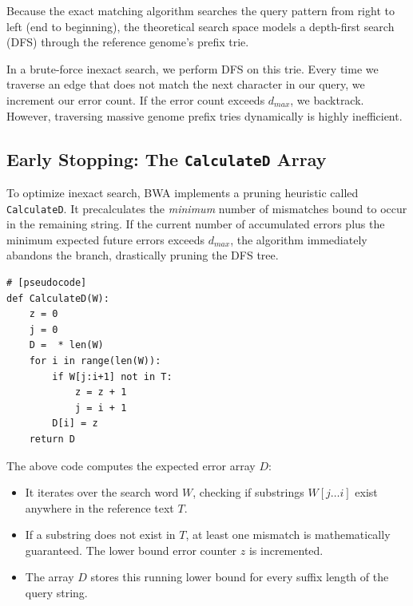 Because the exact matching algorithm searches the query pattern from right to left (end to beginning), the theoretical search space models a depth-first search (DFS) through the reference genome's prefix trie. 


In a brute-force inexact search, we perform DFS on this trie. Every time we traverse an edge that does not match the next character in our query, we increment our error count. If the error count exceeds $d_{max}$, we backtrack. However, traversing massive genome prefix tries dynamically is highly inefficient.

\subsection{Early Stopping: The \texttt{CalculateD} Array}

To optimize inexact search, BWA implements a pruning heuristic called \texttt{CalculateD}. It precalculates the \textit{minimum} number of mismatches bound to occur in the remaining string. If the current number of accumulated errors plus the minimum expected future errors exceeds $d_{max}$, the algorithm immediately abandons the branch, drastically pruning the DFS tree.

\begin{verbatim}
# [pseudocode]
def CalculateD(W):
    z = 0
    j = 0
    D =  * len(W)
    for i in range(len(W)):
        if W[j:i+1] not in T:
            z = z + 1
            j = i + 1
        D[i] = z
    return D
\end{verbatim}

The above code computes the expected error array $D$:
\begin{itemize}
    \item It iterates over the search word $W$, checking if substrings $W[j \dots i]$ exist anywhere in the reference text $T$.
    \item If a substring does not exist in $T$, at least one mismatch is mathematically guaranteed. The lower bound error counter $z$ is incremented.
    \item The array $D$ stores this running lower bound for every suffix length of the query string.
\end{itemize}

